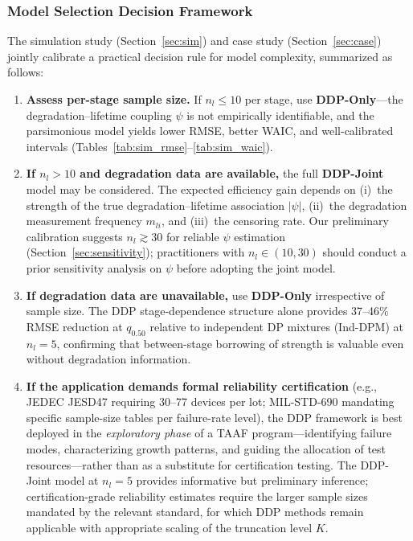 \documentclass[a4paper,fleqn,longmktitle]{cas-sc}
\begin{document}
\subsubsection{Model Selection Decision Framework}

The simulation study (Section~\ref{sec:sim}) and case study (Section~\ref{sec:case}) jointly calibrate a practical decision rule for model complexity, summarized as follows:

\begin{enumerate}
    \item \textbf{Assess per-stage sample size.} If $n_l \leq 10$ per stage, use \textbf{DDP-Only}---the degradation--lifetime coupling $\psi$ is not empirically identifiable, and the parsimonious model yields lower RMSE, better WAIC, and well-calibrated intervals (Tables~\ref{tab:sim_rmse}--\ref{tab:sim_waic}).
    \item \textbf{If $n_l > 10$ and degradation data are available,} the full \textbf{DDP-Joint} model may be considered. The expected efficiency gain depends on (i)~the strength of the true degradation--lifetime association $|\psi|$, (ii)~the degradation measurement frequency $m_{li}$, and (iii)~the censoring rate. Our preliminary calibration suggests $n_l \gtrsim 30$ for reliable $\psi$ estimation (Section~\ref{sec:sensitivity}); practitioners with $n_l \in (10, 30)$ should conduct a prior sensitivity analysis on $\psi$ before adopting the joint model.
    \item \textbf{If degradation data are unavailable,} use \textbf{DDP-Only} irrespective of sample size. The DDP stage-dependence structure alone provides 37--46\% RMSE reduction at $q_{0.50}$ relative to independent DP mixtures (Ind-DPM) at $n_l=5$, confirming that between-stage borrowing of strength is valuable even without degradation information.
    \item \textbf{If the application demands formal reliability certification} (e.g., JEDEC JESD47 requiring 30--77 devices per lot; MIL-STD-690 mandating specific sample-size tables per failure-rate level), the DDP framework is best deployed in the \emph{exploratory phase} of a TAAF program---identifying failure modes, characterizing growth patterns, and guiding the allocation of test resources---rather than as a substitute for certification testing. The DDP-Joint model at $n_l=5$ provides informative but preliminary inference; certification-grade reliability estimates require the larger sample sizes mandated by the relevant standard, for which DDP methods remain applicable with appropriate scaling of the truncation level $K$.
\end{enumerate}
\end{document}
